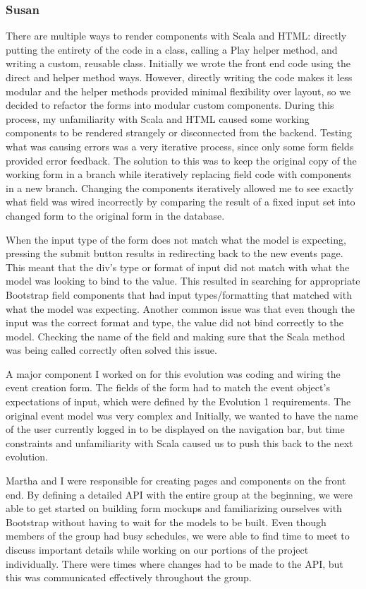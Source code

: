 \documentclass{article}
\begin{document}
    

\subsubsection{Susan}
    There are multiple ways to render components with Scala and HTML: directly putting the entirety of the code in a class, calling a Play helper method, and writing a custom, reusable class. Initially we wrote the front end code using the direct and helper method ways. However, directly writing the code makes it less modular and the helper methods provided minimal flexibility over layout, so we decided to refactor the forms into modular custom components. During this process, my unfamiliarity with Scala and HTML caused some working components to be rendered strangely or disconnected from the backend. Testing what was causing errors was a very iterative process, since only some form fields provided error feedback. The solution to this was to keep the original copy of the working form in a branch while iteratively replacing field code with components in a new branch. Changing the components iteratively allowed me to see exactly what field was wired incorrectly by comparing the result of a fixed input set into changed form to the original form in the database.
    
    When the input type of the form does not match what the model is expecting, pressing the submit button results in redirecting back to the new events page. This meant that the div's type or format of input did not match with what the model was looking to bind to the value. This resulted in searching for appropriate Bootstrap field components that had input types/formatting that matched with what the model was expecting. Another common issue was that even though the input was the correct format and type, the value did not bind correctly to the model. Checking the name of the field and making sure that the Scala method was being called correctly often solved this issue.
    
    A major component I worked on for this evolution was coding and wiring the event creation form. The fields of the form had to match the event object's expectations of input, which were defined by the Evolution 1 requirements. The original event model was very complex and  Initially, we wanted to have the name of the user currently logged in to be displayed on the navigation bar, but time constraints and unfamiliarity with Scala caused us to push this back to the next evolution.
    
    Martha and I were responsible for creating pages and components on the front end. By defining a detailed API with the entire group at the beginning, we were able to get started on building form mockups and familiarizing ourselves with Bootstrap without having to wait for the models to be built. Even though members of the group had busy schedules, we were able to find time to meet to discuss important details while working on our portions of the project individually. There were times where changes had to be made to the API, but this was communicated effectively throughout the group.
    
\end{document}
